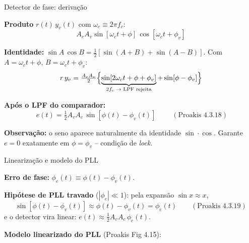 
\begin{frame}{Detector de fase: derivação}

\textbf{Produto} $r(t)\,y_v(t)$ com $\omega_c \equiv 2\pi f_c$:
\[
A_c A_v \sin[\omega_c t + \phi]\,\cos[\omega_c t + \phi_v]
\]

\pause
\textbf{Identidade:} $\sin A\,\cos B = \tfrac{1}{2}[\sin(A+B) + \sin(A-B)]$. Com $A = \omega_c t + \phi$, $B = \omega_c t + \phi_v$:
\[
r\,y_v = \tfrac{A_c A_v}{2}\Bigl\{\underbrace{\sin[2\omega_c t + \phi + \phi_v]}_{2f_c\;\to\;\text{LPF rejeita}} + \sin[\phi - \phi_v]\Bigr\}
\]

\pause
\textbf{Após o LPF do comparador:}
\[
\boxed{\;e(t) = \tfrac{1}{2}A_v A_c\,\sin[\phi(t) - \phi_v(t)]\;} \qquad (\text{Proakis 4.3.18})
\]

\pause
\textbf{Observação:} o seno aparece naturalmente da identidade $\sin\!\cdot\!\cos$. Garante $e = 0$ exatamente em $\phi = \phi_v$ -- condição de \emph{lock}.

\end{frame}


\begin{frame}{Linearização e modelo do PLL}

\textbf{Erro de fase:} $\phi_e(t) \equiv \phi(t) - \phi_v(t)$.

\pause
\textbf{Hipótese de PLL travado} ($|\phi_e| \ll 1$): pela expansão $\sin x \approx x$,
\[
\sin[\phi(t) - \phi_v(t)] \approx \phi(t) - \phi_v(t) = \phi_e(t) \qquad (\text{Proakis 4.3.19})
\]
e o detector vira linear: $e(t) \approx \tfrac{1}{2}A_v A_c\,\phi_e(t)$.

\pause
\textbf{Modelo linearizado do PLL} (Proakis Fig 4.15):

\begin{center}
\end{center}

\end{frame}

